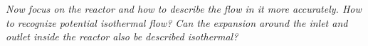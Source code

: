 {\color{greenColor}\itshape
Now focus on the reactor and how to describe the flow in it more accurately.
How to recognize potential isothermal flow?
Can the expansion around the inlet and outlet inside the reactor also be described isothermal?
}
